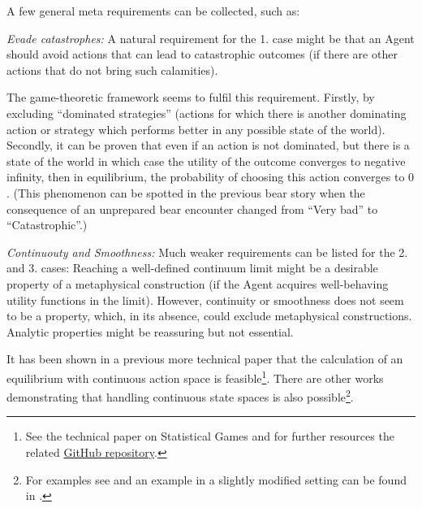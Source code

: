\documentclass{article}
\begin{document}
A few general meta requirements can be collected, such as:

{\it Evade catastrophes:}
A natural requirement for the 1. case might be that an Agent should avoid actions that can lead to catastrophic outcomes (if there are other actions that do not bring such calamities).

The game-theoretic framework seems to fulfil this requirement. Firstly, by excluding ``dominated strategies'' (actions for which there is another dominating action or strategy which performs better in any possible state of the world). Secondly, it can be proven that even if an action is not dominated, but there is a state of the world in which case the utility of the outcome converges to negative infinity, then in equilibrium, the probability of choosing this action converges to $0$. (This phenomenon can be spotted in the previous bear story when the consequence of an unprepared bear encounter changed from ``Very bad'' to ``Catastrophic''.)

{\it Continuouty and Smoothness:}
Much weaker requirements can be listed for the 2. and 3. cases:
Reaching a well-defined continuum limit might be a desirable property of a metaphysical construction (if the Agent acquires well-behaving utility functions in the limit).
However, continuity or smoothness does not seem to be a property, which, in its absence, could exclude metaphysical constructions.
Analytic properties might be reassuring but not essential.

It has been shown in a previous more technical paper that the calculation of an equilibrium with continuous action space is feasible\footnote{See the technical paper on Statistical Games \cite{arxiv:konczer2024statisticalgames} and for further resources the related \href{https://github.com/Konczer/UncertaintyTheory/tree/main/StatisticalGames}{GitHub repository}.}. There are other works demonstrating that handling continuous state spaces is also possible\footnote{For examples see \cite{Kashyap1971,Kashyap1974} and an example in a slightly modified setting can be found in \cite{paper:Abbott2018,paper:Abbott2023}.}. 
\end{document}
